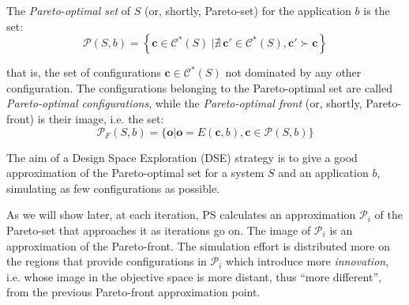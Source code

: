 \begin{definition}
The {\em Pareto-optimal set} of $S$ (or, shortly, Pareto-set) for the application $b$ is the
set:
\[ \mathcal{P}(S,b) = \left\{ \mathbf{c} \in \mathcal{C}^*(S) \ | \nexists \ \mathbf{c}' \in \mathcal{C}^*(S), \mathbf{c}' \succ \mathbf{c} \right\} \]
\end{definition}
that is, the set of configurations $\mathbf{c} \in
\mathcal{C}^*(S)$ not dominated by any other configuration.
The configurations belonging to the Pareto-optimal set are called \emph{Pareto-optimal configurations}, while the {\em Pareto-optimal front} (or, shortly, Pareto-front) is their image, i.e. the set:
\[ \mathcal{P}_{F}(S,b) = \{ \mathbf{o} | \mathbf{o} = E(\mathbf{c},b), \mathbf{c} \in \mathcal{P}(S,b) \} \]

The aim of a Design Space Exploration (DSE) strategy is to give a
good approximation of the Pareto-optimal set for a system $S$ and an
application $b$, simulating as few configurations as possible.


As we will show later, at each iteration, PS calculates an approximation $\mathscr{P}_i$ of the Pareto-set that approaches it as iterations go on. The image of $\mathscr{P}_i$ is an approximation of the Pareto-front.
The simulation effort is distributed more on the regions that provide configurations in $\mathscr{P}_i$ which introduce more \emph{innovation}, i.e. whose image in the objective space is more distant, thus ``more different'', from the previous Pareto-front approximation point.





